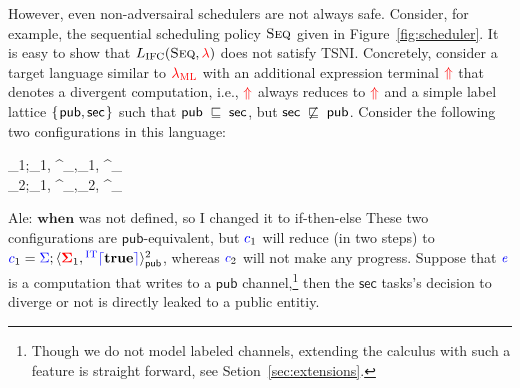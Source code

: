 \documentclass{sigplanconf}
\newcommand{\Varid}[1]{\mathit{#1}}
\def\resethooks{%
  \global\let\SaveRestoreHook\empty
  \global\let\ColumnHook\empty}
\let\hspre\empty
\let\hspost\empty
\newcommand{\Red}[1]{{\color{red} #1}}
\begin{document}
However, even non-adversairal schedulers are not always safe.
Consider, for example, the sequential scheduling policy \ensuremath{\textsc{Seq}} given in
Figure~\ref{fig:scheduler}.
%
It is easy to show that \ensuremath{L_\text{IFC}(\textsc{Seq},\Red{\lambda})} does not satisfy
TSNI.
%
Concretely, consider a target language similar to \ensuremath{\Red{\lambda_{\text{ML}}}} with an
additional expression terminal \ensuremath{\tar{\Uparrow}} that denotes a divergent computation,
i.e., \ensuremath{\tar{\Uparrow}} always reduces to \ensuremath{\tar{\Uparrow}} and a simple label lattice \ensuremath{\{\mskip1.5mu \mathsf{pub},\mathsf{sec}\mskip1.5mu\}} such that \ensuremath{\mathsf{pub}\;\flows\;\mathsf{sec}}, but \ensuremath{\mathsf{sec}\;\not\flows\;\mathsf{pub}}.
Consider the following two configurations in this language:
\begin{hscode}\SaveRestoreHook
\column{B}{@{}>{\hspre}l<{\hspost}@{}}%
\column{71}{@{}>{\hspre}l<{\hspost}@{}}%
\column{E}{@{}>{\hspre}l<{\hspost}@{}}%
\>[B]{}_{1}\mathrel{=}\ifc{\Sigma};\langle \tar{\Sigma}_{1}, \;\;\;\;\tar{\Uparrow}\;\;\ifc{\rceil}\rangle^{}_{},{}\<[71]%
\>[71]{}\langle \tar{\Sigma}_{1}, \ifc{\Varid{e}}\rangle^{}_{}{}\<[E]%
\\
\>[B]{}_{2}\mathrel{=}\ifc{\Sigma};\langle \tar{\Sigma}_{1}, \;\;\;\;\tar{\Uparrow}\;\;\ifc{\rceil}\rangle^{}_{},{}\<[71]%
\>[71]{}\langle \tar{\Sigma}_{2}, \ifc{\Varid{e}}\rangle^{}_{}{}\<[E]%
\ColumnHook
\end{hscode}\resethooks
\Red{Ale: \ensuremath{\mathbf{when}} was not defined, so I changed it to if-then-else}
These two configurations are \ensuremath{\mathsf{pub}}-equivalent, but \ensuremath{\ifc{c}_{1}} will reduce 
(in two steps) 
to \ensuremath{\ifc{c}_{1}\mathrel{=}\ifc{\Sigma};\langle \tar{\Sigma}_{1}, \ifc{^{\textrm{IT}}\lceil}\mathbf{true}\ifc{\rceil}\rangle^{\mathrm{2}}_{\mathsf{pub}}}, whereas \ensuremath{\ifc{c}_{2}} will not make
any progress.
%
Suppose that \ensuremath{\ifc{\Varid{e}}} is a computation that writes to a \ensuremath{\mathsf{pub}} channel,\footnote{
Though we do not model labeled channels, extending the calculus with such a
feature is straight forward, see Setion~\ref{sec:extensions}.}
then the \ensuremath{\mathsf{sec}} tasks's decision to diverge or not is directly leaked to a
public entitiy.
\end{document}
